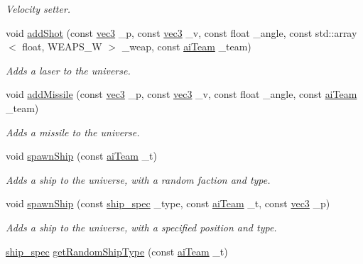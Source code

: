 \begin{DoxyCompactItemize}
\begin{DoxyCompactList}\small\item\em Velocity setter. \end{DoxyCompactList}\item 
void \hyperlink{classuniverse_aca6b40fadb1c8390469e6422d61b4c1c}{add\-Shot} (const \hyperlink{structvec3}{vec3} \-\_\-p, const \hyperlink{structvec3}{vec3} \-\_\-v, const float \-\_\-angle, const std\-::array$<$ float, W\-E\-A\-P\-S\-\_\-\-W $>$ \-\_\-weap, const \hyperlink{enemy_8hpp_abac1fdbabb5a6be5f0d6ae40be5c5a58}{ai\-Team} \-\_\-team)
\begin{DoxyCompactList}\small\item\em Adds a laser to the universe. \end{DoxyCompactList}\item 
void \hyperlink{classuniverse_a84c5bf8acb410c81173e0de687fb8672}{add\-Missile} (const \hyperlink{structvec3}{vec3} \-\_\-p, const \hyperlink{structvec3}{vec3} \-\_\-v, const float \-\_\-angle, const \hyperlink{enemy_8hpp_abac1fdbabb5a6be5f0d6ae40be5c5a58}{ai\-Team} \-\_\-team)
\begin{DoxyCompactList}\small\item\em Adds a missile to the universe. \end{DoxyCompactList}\item 
void \hyperlink{classuniverse_afcfa317aadb3a1477e76e2fd8caff1e7}{spawn\-Ship} (const \hyperlink{enemy_8hpp_abac1fdbabb5a6be5f0d6ae40be5c5a58}{ai\-Team} \-\_\-t)
\begin{DoxyCompactList}\small\item\em Adds a ship to the universe, with a random faction and type. \end{DoxyCompactList}\item 
void \hyperlink{classuniverse_a74264fec3d84faf13ab70248be7469c5}{spawn\-Ship} (const \hyperlink{ship_8hpp_af74a63841701826d661cb9809aaf7092}{ship\-\_\-spec} \-\_\-type, const \hyperlink{enemy_8hpp_abac1fdbabb5a6be5f0d6ae40be5c5a58}{ai\-Team} \-\_\-t, const \hyperlink{structvec3}{vec3} \-\_\-p)
\begin{DoxyCompactList}\small\item\em Adds a ship to the universe, with a specified position and type. \end{DoxyCompactList}\item 
\hyperlink{ship_8hpp_af74a63841701826d661cb9809aaf7092}{ship\-\_\-spec} \hyperlink{classuniverse_ad711d97b18ae3f9e35535bf04dd3b0af}{get\-Random\-Ship\-Type} (const \hyperlink{enemy_8hpp_abac1fdbabb5a6be5f0d6ae40be5c5a58}{ai\-Team} \-\_\-t)

\end{DoxyCompactItemize}
